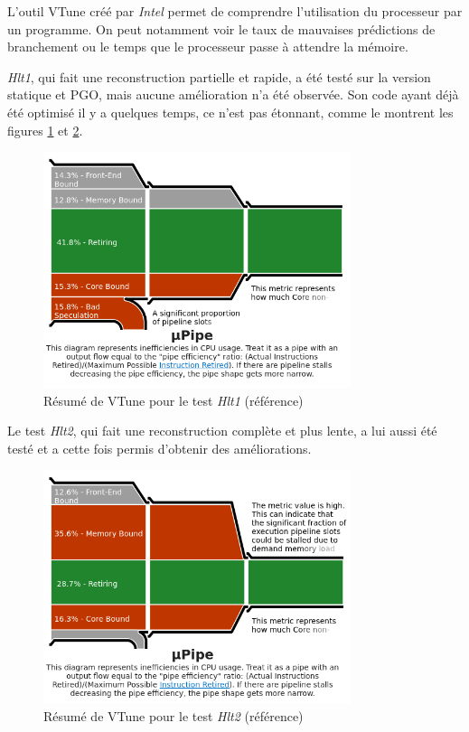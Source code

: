 \documentclass[a4paper,11pt]{report}
\begin{document}
L'outil VTune créé par \emph{Intel} permet de comprendre l'utilisation du processeur par un programme.
On peut notamment voir le taux de mauvaises prédictions de branchement ou le temps que le processeur passe à attendre la mémoire.

\emph{Hlt1}, qui fait une reconstruction partielle et rapide, a été testé sur la version statique et PGO, mais aucune amélioration n'a été observée.
Son code ayant déjà été optimisé il y a quelques temps, ce n'est pas étonnant, comme le montrent les figures \ref{hlt1_vtune_pipe} et \ref{hlt2_vtune_pipe}.

\begin{figure}[H]
    \includegraphics[width=0.8\textwidth, center]{hlt1_vtune_pipe.png}
    \caption{Résumé de VTune pour le test \emph{Hlt1} (référence)}
    \label{hlt1_vtune_pipe}
\end{figure}

Le test \emph{Hlt2}, qui fait une reconstruction complète et plus lente, a lui aussi été testé et a cette fois permis d'obtenir des améliorations.

\begin{figure}[H]
    \includegraphics[width=0.8\textwidth, center]{hlt2_vtune_pipe.png}
    \caption{Résumé de VTune pour le test \emph{Hlt2} (référence)}
    \label{hlt2_vtune_pipe}
\end{figure}
\end{document}
